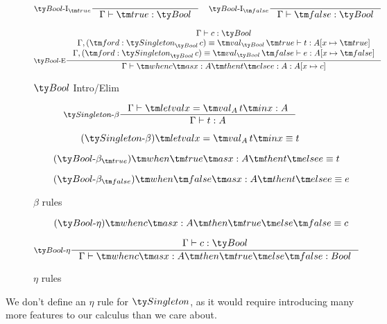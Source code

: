 \begin{figure*}[h]
  \[
  \inference[\Intro{$\Bool$}$_{\true}$]{}
            {\Gamma \vdash \true : \Bool}
  \quad
  \inference[\Intro{$\Bool$}$_{\false}$]{}
            {\Gamma \vdash \false : \Bool}
  \]

  \[
  \inference[\Elim{$\Bool$}]
            {\Gamma \vdash c : \Bool
            \\ \Gamma, (\ford : \Singleton[\Bool][c]) \equiv \val[\Bool][\true] \vdash t : A[x \mapsto \true]
            \\ \Gamma, (\ford : \Singleton[\Bool][c]) \equiv \val[\Bool][\false] \vdash e : A[x \mapsto \false]
            }
            {\Gamma \vdash \when c x A t e : A : A[x \mapsto c]}
  \]

  \caption*{$\Bool$ Intro/Elim}
  \label{fig:dt-singletons-bool-intro-elim}
\end{figure*}



\begin{figure*}[h]
  \[
  \inference[$\Singleton$-$\beta$]
            { \Gamma \vdash \letval x {\val[A][t]} x : A
            }
            {\Gamma \vdash t : A}
  \]

  \begin{equation}
    \tag{$\Singleton$-$\beta$}
    \letval x {\val[A][t]} x \equiv t
  \end{equation}

  \begin{equation}
    \tag{$\Bool$-$\beta_{\true}$}
    \when \true x A t e \equiv t
  \end{equation}

  \begin{equation}
    \tag{$\Bool$-$\beta_{\false}$}
    \when \false x A t e \equiv e
  \end{equation}

  \caption*{$\beta$ rules}
  \label{fig:dt-singletons-beta}
\end{figure*}

\begin{figure*}[h]
  \begin{equation}
    \tag{$\Bool$-$\eta$}
    \when c x A \true \false \equiv c
  \end{equation}

  \[
  \inference[$\Bool$-$\eta$]
            { \Gamma \vdash c : \Bool}
            {\Gamma \vdash \when c x A \true \false : Bool}
  \]

  \caption*{$\eta$ rules}
  \label{fig:dt-singletons-eta}
\end{figure*}

We don't define an $\eta$ rule for $\Singleton$, as it would require introducing many more features to our calculus than we care about.
